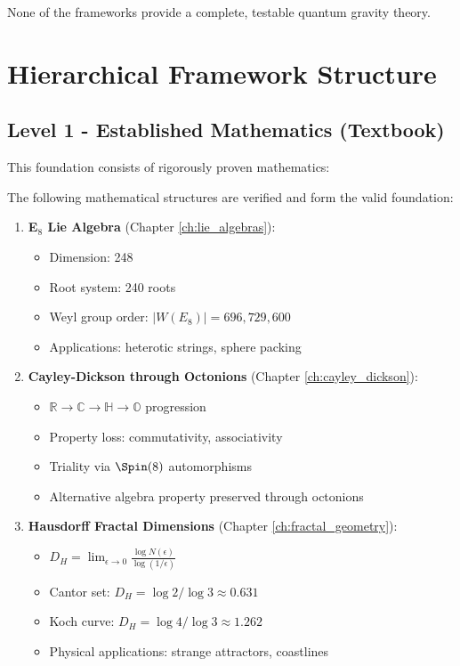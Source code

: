 None of the frameworks provide a complete, testable quantum gravity theory.

\section{Hierarchical Framework Structure}

\subsection{Level 1 - Established Mathematics (Textbook)}

This foundation consists of rigorously proven mathematics:

\begin{theorem}
The following mathematical structures are verified and form the valid foundation:
\begin{enumerate}
    \item \textbf{E$_8$ Lie Algebra} (Chapter \ref{ch:lie_algebras}):
    \begin{itemize}
        \item Dimension: 248
        \item Root system: 240 roots
        \item Weyl group order: $|W(E_8)| = 696,729,600$
        \item Applications: heterotic strings, sphere packing
    \end{itemize}

    \item \textbf{Cayley-Dickson through Octonions} (Chapter \ref{ch:cayley_dickson}):
    \begin{itemize}
        \item $\mathbb{R} \to \mathbb{C} \to \mathbb{H} \to \mathbb{O}$ progression
        \item Property loss: commutativity, associativity
        \item Triality via $\Spin(8)$ automorphisms
        \item Alternative algebra property preserved through octonions
    \end{itemize}

    \item \textbf{Hausdorff Fractal Dimensions} (Chapter \ref{ch:fractal_geometry}):
    \begin{itemize}
        \item $D_H = \lim_{\epsilon \to 0} \frac{\log N(\epsilon)}{\log(1/\epsilon)}$
        \item Cantor set: $D_H = \log 2 / \log 3 \approx 0.631$
        \item Koch curve: $D_H = \log 4 / \log 3 \approx 1.262$
        \item Physical applications: strange attractors, coastlines
    \end{itemize}


\end{enumerate}
\end{theorem}
